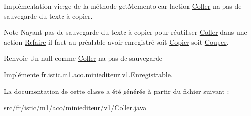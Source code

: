 Implémentation vierge de la méthode get\+Memento car l\textquotesingle{}action \hyperlink{classfr_1_1istic_1_1m1_1_1aco_1_1miniediteur_1_1v1_1_1Coller}{Coller} n\textquotesingle{}a pas de sauvegarde du texte à copier. 

\begin{DoxyNote}{Note}
N\textquotesingle{}ayant pas de sauvegarde du texte à copier pour réutiliser \hyperlink{classfr_1_1istic_1_1m1_1_1aco_1_1miniediteur_1_1v1_1_1Coller}{Coller} dans une action \hyperlink{classfr_1_1istic_1_1m1_1_1aco_1_1miniediteur_1_1v1_1_1Refaire}{Refaire} il faut au préalable avoir enregistré soit \hyperlink{classfr_1_1istic_1_1m1_1_1aco_1_1miniediteur_1_1v1_1_1Copier}{Copier} soit \hyperlink{classfr_1_1istic_1_1m1_1_1aco_1_1miniediteur_1_1v1_1_1Couper}{Couper}. 
\end{DoxyNote}
\begin{DoxyReturn}{Renvoie}
Un null comme \hyperlink{classfr_1_1istic_1_1m1_1_1aco_1_1miniediteur_1_1v1_1_1Coller}{Coller} n\textquotesingle{}a pas de sauvegarde 
\end{DoxyReturn}


Implémente \hyperlink{interfacefr_1_1istic_1_1m1_1_1aco_1_1miniediteur_1_1v1_1_1Enregistrable}{fr.\+istic.\+m1.\+aco.\+miniediteur.\+v1.\+Enregistrable}.



La documentation de cette classe a été générée à partir du fichier suivant \+:\begin{DoxyCompactItemize}
\item 
src/fr/istic/m1/aco/miniediteur/v1/\hyperlink{Coller_8java}{Coller.\+java}\end{DoxyCompactItemize}
